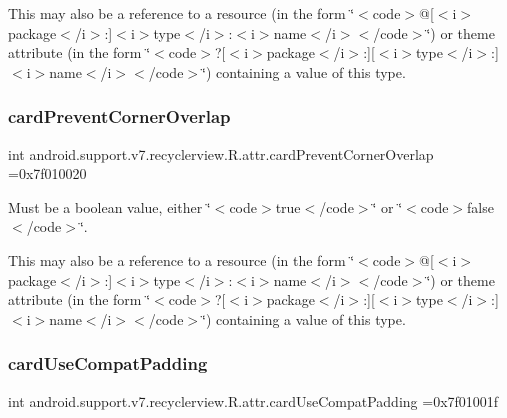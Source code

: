 This may also be a reference to a resource (in the form \char`\"{}$<$code$>$@\mbox{[}$<$i$>$package$<$/i$>$\+:\mbox{]}$<$i$>$type$<$/i$>$\+:$<$i$>$name$<$/i$>$$<$/code$>$\char`\"{}) or theme attribute (in the form \char`\"{}$<$code$>$?\mbox{[}$<$i$>$package$<$/i$>$\+:\mbox{]}\mbox{[}$<$i$>$type$<$/i$>$\+:\mbox{]}$<$i$>$name$<$/i$>$$<$/code$>$\char`\"{}) containing a value of this type. \mbox{\label{classandroid_1_1support_1_1v7_1_1recyclerview_1_1R_1_1attr_a29b8196e3b63cdcec598aece9a812243}} 
\subsubsection{\texorpdfstring{card\+Prevent\+Corner\+Overlap}{cardPreventCornerOverlap}}
{\footnotesize\ttfamily int android.\+support.\+v7.\+recyclerview.\+R.\+attr.\+card\+Prevent\+Corner\+Overlap =0x7f010020\hspace{0.3cm}{\ttfamily [static]}}

Must be a boolean value, either \char`\"{}$<$code$>$true$<$/code$>$\char`\"{} or \char`\"{}$<$code$>$false$<$/code$>$\char`\"{}. 

This may also be a reference to a resource (in the form \char`\"{}$<$code$>$@\mbox{[}$<$i$>$package$<$/i$>$\+:\mbox{]}$<$i$>$type$<$/i$>$\+:$<$i$>$name$<$/i$>$$<$/code$>$\char`\"{}) or theme attribute (in the form \char`\"{}$<$code$>$?\mbox{[}$<$i$>$package$<$/i$>$\+:\mbox{]}\mbox{[}$<$i$>$type$<$/i$>$\+:\mbox{]}$<$i$>$name$<$/i$>$$<$/code$>$\char`\"{}) containing a value of this type. \mbox{\label{classandroid_1_1support_1_1v7_1_1recyclerview_1_1R_1_1attr_ab3c2e51e3f27b6ff7ff09edcbed877fe}} 
\subsubsection{\texorpdfstring{card\+Use\+Compat\+Padding}{cardUseCompatPadding}}
{\footnotesize\ttfamily int android.\+support.\+v7.\+recyclerview.\+R.\+attr.\+card\+Use\+Compat\+Padding =0x7f01001f\hspace{0.3cm}{\ttfamily [static]}}

